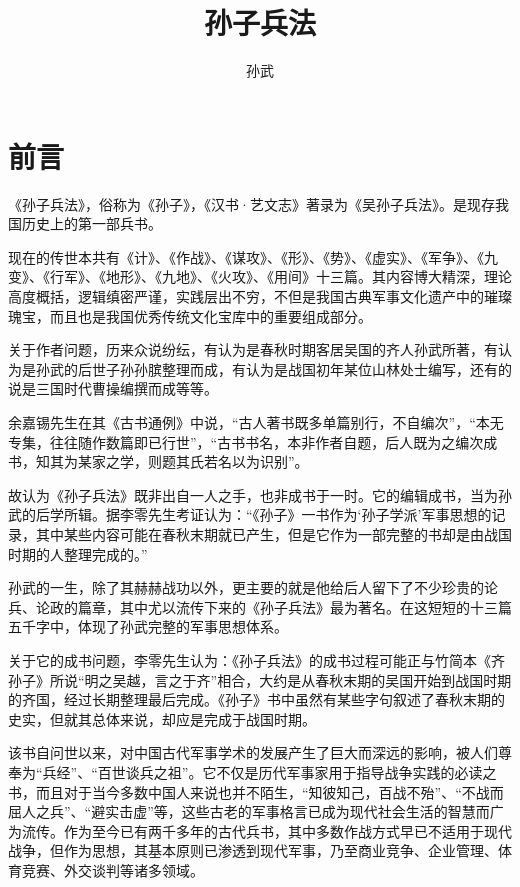 \documentclass[12pt,UTF8]{ctexbook}
\title{\heiti\zihao{0} 孙子兵法}
\author{孙武}
\date{}
\begin{document}
	
\maketitle
\tableofcontents

\frontmatter
\chapter{前言}
    
《孙子兵法》，俗称为《孙子》，《汉书·艺文志》著录为《吴孙子兵法》。是现存我国历史上的第一部兵书。

现在的传世本共有《计》、《作战》、《谋攻》、《形》、《势》、《虚实》、《军争》、《九变》、《行军》、《地形》、《九地》、《火攻》、《用间》十三篇。其内容博大精深，理论高度概括，逻辑缜密严谨，实践层出不穷，不但是我国古典军事文化遗产中的璀璨瑰宝，而且也是我国优秀传统文化宝库中的重要组成部分。

关于作者问题，历来众说纷纭，有认为是春秋时期客居吴国的齐人孙武所著，有认为是孙武的后世子孙孙膑整理而成，有认为是战国初年某位山林处士编写，还有的说是三国时代曹操编撰而成等等。

余嘉锡先生在其《古书通例》中说，“古人著书既多单篇别行，不自编次”，“本无专集，往往随作数篇即已行世”，“古书书名，本非作者自题，后人既为之编次成书，知其为某家之学，则题其氏若名以为识别”。

故认为《孙子兵法》既非出自一人之手，也非成书于一时。它的编辑成书，当为孙武的后学所辑。据李零先生考证认为：“《孙子》一书作为‘孙子学派’军事思想的记录，其中某些内容可能在春秋末期就已产生，但是它作为一部完整的书却是由战国时期的人整理完成的。”

孙武的一生，除了其赫赫战功以外，更主要的就是他给后人留下了不少珍贵的论兵、论政的篇章，其中尤以流传下来的《孙子兵法》最为著名。在这短短的十三篇五千字中，体现了孙武完整的军事思想体系。

关于它的成书问题，李零先生认为：《孙子兵法》的成书过程可能正与竹简本《齐孙子》所说“明之吴越，言之于齐”相合，大约是从春秋末期的吴国开始到战国时期的齐国，经过长期整理最后完成。《孙子》书中虽然有某些字句叙述了春秋末期的史实，但就其总体来说，却应是完成于战国时期。

该书自问世以来，对中国古代军事学术的发展产生了巨大而深远的影响，被人们尊奉为“兵经”、“百世谈兵之祖”。它不仅是历代军事家用于指导战争实践的必读之书，而且对于当今多数中国人来说也并不陌生，“知彼知己，百战不殆”、“不战而屈人之兵”、“避实击虚”等，这些古老的军事格言已成为现代社会生活的智慧而广为流传。作为至今已有两千多年的古代兵书，其中多数作战方式早已不适用于现代战争，但作为思想，其基本原则已渗透到现代军事，乃至商业竞争、企业管理、体育竞赛、外交谈判等诸多领域。
\end{document}
